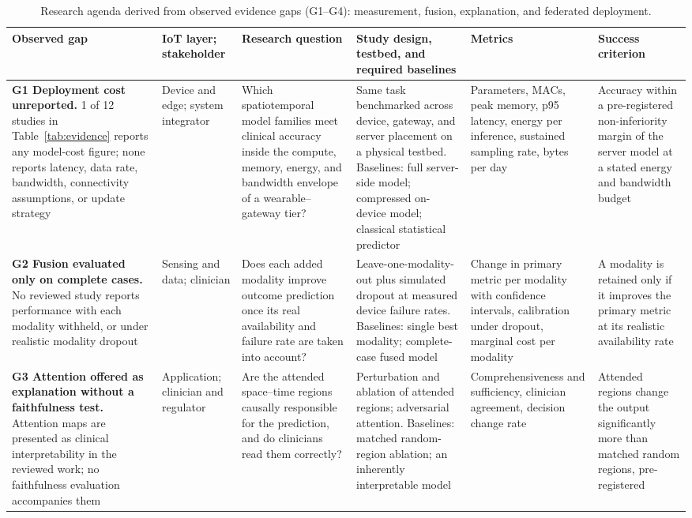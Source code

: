 \documentclass[journal]{IEEEtran}
\newif\ifsubmission
\begin{document}
\ifsubmission\else
\begin{table}[p]
\centering
\caption{Research agenda derived from observed evidence gaps (G1--G4): measurement, fusion, explanation, and federated deployment.}
\label{tab:agenda-a}
\scriptsize
\setlength{\tabcolsep}{3pt}
\renewcommand{\arraystretch}{1.12}
\begin{tabularx}{\textwidth}{>{\raggedright\arraybackslash}p{3.4cm} >{\raggedright\arraybackslash}p{1.9cm} >{\raggedright\arraybackslash}X >{\raggedright\arraybackslash}X >{\raggedright\arraybackslash}p{2.9cm} >{\raggedright\arraybackslash}p{3.0cm}}
\toprule
\textbf{Observed gap} & \textbf{IoT layer; stakeholder} & \textbf{Research question} & \textbf{Study design, testbed, and required baselines} & \textbf{Metrics} & \textbf{Success criterion} \\
\midrule
\textbf{G1 Deployment cost unreported.} 1 of 12 studies in Table~\ref{tab:evidence} reports any model-cost figure; none reports latency, data rate, bandwidth, connectivity assumptions, or update strategy & Device and edge; system integrator & Which spatiotemporal model families meet clinical accuracy inside the compute, memory, energy, and bandwidth envelope of a wearable--gateway tier? & Same task benchmarked across device, gateway, and server placement on a physical testbed. Baselines: full server-side model; compressed on-device model; classical statistical predictor & Parameters, MACs, peak memory, p95 latency, energy per inference, sustained sampling rate, bytes per day & Accuracy within a pre-registered non-inferiority margin of the server model at a stated energy and bandwidth budget \\
\addlinespace[3pt]
\textbf{G2 Fusion evaluated only on complete cases.} No reviewed study reports performance with each modality withheld, or under realistic modality dropout & Sensing and data; clinician & Does each added modality improve outcome prediction once its real availability and failure rate are taken into account? & Leave-one-modality-out plus simulated dropout at measured device failure rates. Baselines: single best modality; complete-case fused model & Change in primary metric per modality with confidence intervals, calibration under dropout, marginal cost per modality & A modality is retained only if it improves the primary metric at its realistic availability rate \\
\addlinespace[3pt]
\textbf{G3 Attention offered as explanation without a faithfulness test.} Attention maps are presented as clinical interpretability in the reviewed work; no faithfulness evaluation accompanies them & Application; clinician and regulator & Are the attended space--time regions causally responsible for the prediction, and do clinicians read them correctly? & Perturbation and ablation of attended regions; adversarial attention. Baselines: matched random-region ablation; an inherently interpretable model & Comprehensiveness and sufficiency, clinician agreement, decision change rate & Attended regions change the output significantly more than matched random regions, pre-registered \\

\end{tabularx}
\end{table}
\end{document}
